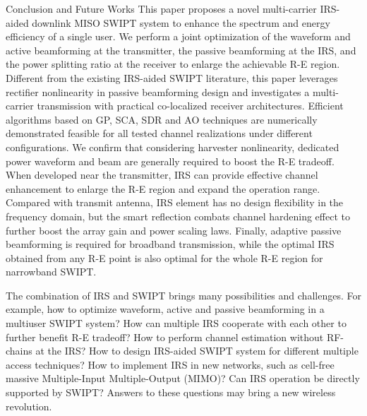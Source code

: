 \documentclass[journal]{IEEEtran}
\begin{document}
	\begin{section}{Conclusion and Future Works}\label{se:conclusion_and_future_works}
		This paper proposes a novel multi-carrier IRS-aided downlink MISO SWIPT system to enhance the spectrum and energy efficiency of a single user. We perform a joint optimization of the waveform and active beamforming at the transmitter, the passive beamforming at the IRS, and the power splitting ratio at the receiver to enlarge the achievable R-E region. Different from the existing IRS-aided SWIPT literature, this paper leverages rectifier nonlinearity in passive beamforming design and investigates a multi-carrier transmission with practical co-localized receiver architectures. Efficient algorithms based on GP, SCA, SDR and AO techniques are numerically demonstrated feasible for all tested channel realizations under different configurations. We confirm that considering harvester nonlinearity, dedicated power waveform and beam are generally required to boost the R-E tradeoff. When developed near the transmitter, IRS can provide effective channel enhancement to enlarge the R-E region and expand the operation range. Compared with transmit antenna, IRS element has no design flexibility in the frequency domain, but the smart reflection combats channel hardening effect to further boost the array gain and power scaling laws. Finally, adaptive passive beamforming is required for broadband transmission, while the optimal IRS obtained from any R-E point is also optimal for the whole R-E region for narrowband SWIPT.

		The combination of IRS and SWIPT brings many possibilities and challenges. For example, how to optimize waveform, active and passive beamforming in a multiuser SWIPT system? How can multiple IRS cooperate with each other to further benefit R-E tradeoff? How to perform channel estimation without RF-chains at the IRS? How to design IRS-aided SWIPT system for different multiple access techniques? How to implement IRS in new networks, such as cell-free massive Multiple-Input Multiple-Output (MIMO)? Can IRS operation be directly supported by SWIPT? Answers to these questions may bring a new wireless revolution.
	\end{section}


	
	
\end{document}
